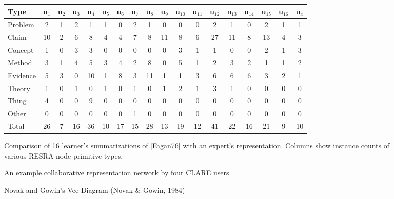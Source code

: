 \newpage
{}
\small
\begin{figure}[h]
  \begin{center}
  \begin{tabular} {||l|c|c|c|c|c|c|c|c|c|c|c|c|c|c|c|c||c||} \hline
  Type &u\(_1\) & u\(_2\) & u\(_3\) & u\(_4\) & u\(_5\) &  u\(_6\) &  u\(_7\) &  u\(_8\) &  u\(_9\) &  u\(_{10}\) &  u\(_{11}\) &  u\(_{12}\) &  u\(_{13}\) &  u\(_14\) &  u\(_{15}\) &  u\(_{16}\) & u\(_x\) \\ \hline \hline
Problem&  2&  1& 2& 1&  1& 0& 2& 1&  0&  0& 0& 2&  1&  0& 2&  1& 1 \\ \hline
Claim  &  10& 2& 6& 8&  4& 4& 7& 8&  11& 8& 6& 27& 11& 8& 13& 4& 3 \\ \hline
Concept&  1&  0& 3& 3&  0& 0& 0& 0&  0&  3& 1& 1&  0&  0& 2&  1& 3 \\ \hline
Method &  3&  1& 4& 5&  3& 4& 2& 8&  0&  5& 1& 2&  3&  2& 1&  1& 2 \\ \hline
Evidence& 5&  3& 0& 10& 1& 8& 3& 11& 1&  1& 3& 6&  6&  6& 3&  2& 1 \\ \hline
Theory  & 1&  0& 1& 0&  1& 0& 1& 0&  1&  2& 1& 3&  1&  0& 0&  0& 0 \\ \hline
Thing   & 4&  0& 0& 9&  0& 0& 0& 0&  0&  0& 0& 0&  0&  0& 0&  0& 0 \\ \hline
Other   & 0&  0& 0& 0&  0& 0& 1& 0&  0&  0& 0& 0&  0&  0& 0&  0& 0 \\ \hline \hline 
Total   & 26& 7& 16&36&10&17&15&28&  13& 19&12&41& 22& 16&21& 9& 10 \\ \hline \hline 
\end{tabular}
\end{center}
  \caption{ Comparison of 16 learner's summarizations of [Fagan76] with an
  expert's representation. Columns show instance counts of various RESRA
  node primitive types.}
  \label{tab:fagan}
\end{figure}
 \normalsize
{}

\newpage
\begin{figure}[h]
 \centerline{}
 \caption{An example collaborative representation network by four CLARE users} 
  \label{fig:arg-example}
\end{figure}

\newpage
\begin{figure}[h]
 \centerline{}
 \caption{Novak and Gowin's Vee Diagram (Novak \& Gowin, 1984)}
  \label{fig:vee}
\end{figure}










